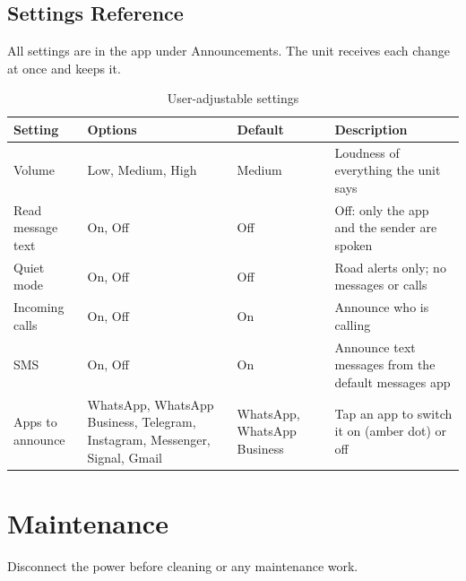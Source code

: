 \documentclass[11pt,a4paper,oneside]{report}
\newcommand{\hdr}[1]{\cellcolor{LightBlue}\textbf{#1}}
\newcommand{\ui}[1]{\textsf{#1}}
\begin{document}
\section{Settings Reference}\label{sec:settings}
All settings are in the app under \ui{Announcements}. The unit receives each change at once and keeps it.
\begin{table}[H]\centering\small
\caption{User-adjustable settings}
\begin{tabularx}{\linewidth}{|>{\raggedright\arraybackslash}p{2.7cm}|>{\raggedright\arraybackslash}p{3.3cm}|>{\raggedright\arraybackslash}p{2.3cm}|X|}\hline
\hdr{Setting} & \hdr{Options} & \hdr{Default} & \hdr{Description}\\ \hline
\ui{Volume} & Low, Medium, High & Medium & Loudness of everything the unit says\\ \hline
\ui{Read message text} & On, Off & Off & Off: only the app and the sender are spoken\\ \hline
\ui{Quiet mode} & On, Off & Off & Road alerts only; no messages or calls\\ \hline
\ui{Incoming calls} & On, Off & On & Announce who is calling\\ \hline
\ui{SMS} & On, Off & On & Announce text messages from the default messages app\\ \hline
\ui{Apps to announce} & WhatsApp, WhatsApp Business, Telegram, Instagram, Messenger, Signal, Gmail & WhatsApp, WhatsApp Business & Tap an app to switch it on (amber dot) or off\\ \hline
\end{tabularx}\end{table}

\chapter{Maintenance}\label{ch:maint}
\begin{caution}
Disconnect the power before cleaning or any maintenance work.
\end{caution}
\end{document}
